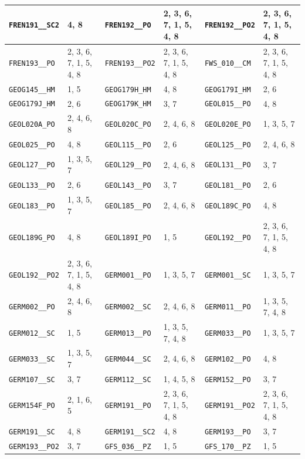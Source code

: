\begin{longtable}{|l|l||l|l||l|l|}
    \verb|FREN191__SC2| & 4, 8 & \verb|FREN192__PO| & 2, 3, 6, 7, 1, 5, 4, 8 & \verb|FREN192__PO2| & 2, 3, 6, 7, 1, 5, 4, 8\\\hline
    \verb|FREN193__PO| & 2, 3, 6, 7, 1, 5, 4, 8 & \verb|FREN193__PO2| & 2, 3, 6, 7, 1, 5, 4, 8 & \verb|FWS_010__CM| & 2, 3, 6, 7, 1, 5, 4, 8\\\hline
    \verb|GEOG145__HM| & 1, 5 & \verb|GEOG179H_HM| & 4, 8 & \verb|GEOG179I_HM| & 2, 6\\\hline
    \verb|GEOG179J_HM| & 2, 6 & \verb|GEOG179K_HM| & 3, 7 & \verb|GEOL015__PO| & 4, 8\\\hline
    \verb|GEOL020A_PO| & 2, 4, 6, 8 & \verb|GEOL020C_PO| & 2, 4, 6, 8 & \verb|GEOL020E_PO| & 1, 3, 5, 7\\\hline
    \verb|GEOL025__PO| & 4, 8 & \verb|GEOL115__PO| & 2, 6 & \verb|GEOL125__PO| & 2, 4, 6, 8\\\hline
    \verb|GEOL127__PO| & 1, 3, 5, 7 & \verb|GEOL129__PO| & 2, 4, 6, 8 & \verb|GEOL131__PO| & 3, 7\\\hline
    \verb|GEOL133__PO| & 2, 6 & \verb|GEOL143__PO| & 3, 7 & \verb|GEOL181__PO| & 2, 6\\\hline
    \verb|GEOL183__PO| & 1, 3, 5, 7 & \verb|GEOL185__PO| & 2, 4, 6, 8 & \verb|GEOL189C_PO| & 4, 8\\\hline
    \verb|GEOL189G_PO| & 4, 8 & \verb|GEOL189I_PO| & 1, 5 & \verb|GEOL192__PO| & 2, 3, 6, 7, 1, 5, 4, 8\\\hline
    \verb|GEOL192__PO2| & 2, 3, 6, 7, 1, 5, 4, 8 & \verb|GERM001__PO| & 1, 3, 5, 7 & \verb|GERM001__SC| & 1, 3, 5, 7\\\hline
    \verb|GERM002__PO| & 2, 4, 6, 8 & \verb|GERM002__SC| & 2, 4, 6, 8 & \verb|GERM011__PO| & 1, 3, 5, 7, 4, 8\\\hline
    \verb|GERM012__SC| & 1, 5 & \verb|GERM013__PO| & 1, 3, 5, 7, 4, 8 & \verb|GERM033__PO| & 1, 3, 5, 7\\\hline
    \verb|GERM033__SC| & 1, 3, 5, 7 & \verb|GERM044__SC| & 2, 4, 6, 8 & \verb|GERM102__PO| & 4, 8\\\hline
    \verb|GERM107__SC| & 3, 7 & \verb|GERM112__SC| & 1, 4, 5, 8 & \verb|GERM152__PO| & 3, 7\\\hline
    \verb|GERM154F_PO| & 2, 1, 6, 5 & \verb|GERM191__PO| & 2, 3, 6, 7, 1, 5, 4, 8 & \verb|GERM191__PO2| & 2, 3, 6, 7, 1, 5, 4, 8\\\hline
    \verb|GERM191__SC| & 4, 8 & \verb|GERM191__SC2| & 4, 8 & \verb|GERM193__PO| & 3, 7\\\hline
    \verb|GERM193__PO2| & 3, 7 & \verb|GFS_036__PZ| & 1, 5 & \verb|GFS_170__PZ| & 1, 5\\\hline

\end{longtable}
